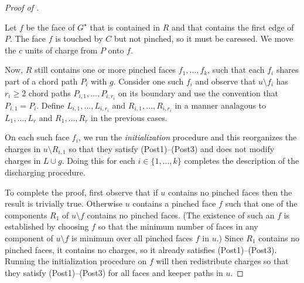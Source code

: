 \documentclass{patmorin}
\newcommand{\dual}[1]{{#1}^\star}
\begin{document}
\begin{proof}[Proof of ]
\begin{enumerate}
  Let $f$ be the face of $\dual{G}$ that is contained in $R$ and that contains the first edge of $P$.  The face $f$ is touched by $C$ but not pinched, so it must be caressed.  We move the $c$ units of charge from $P$ onto $f$.

  Now, $R$ still contains one or more pinched faces  $f_1,\ldots,f_k$, such that each $f_i$ shares part of a chord path $P_i$ with $g$.  Consider one such $f_i$ and observe that $u\setminus f_i$ has $r_i\ge 2$ chord paths $P_{i,1},\ldots,P_{i,r_i}$ on its boundary and use the convention that $P_{i,1}=P_i$.  Define $L_{i,1},\ldots,L_{i,r_i}$ and $R_{i,1},\ldots,R_{i,r_i}$ in a manner analagous to $L_1,\ldots,L_r$ and $R_1,\ldots,R_r$ in the previous cases.

  On each such face $f_i$, we run the \emph{initialization} procedure and this reorganizes the charges in $u\setminus R_{i,1}$ so that they satisfy (Post1)--(Post3) and does not modify charges in $L\cup g$.  Doing this for each $i\in\{1,\ldots,k\}$ completes the description of the discharging procedure.
\end{enumerate}
  To complete the proof, first observe that if $u$ contains no pinched faces then the result is trivially true. Otherwise $u$ contains a pinched face $f$ such that one of the components $R_1$ of $u\setminus f$ contains no pinched faces.  (The existence of such an $f$ is established by choosing $f$ so that the minimum number of faces in any component of $u\setminus f$ is minimum over all pinched faces $f$ in $u$.)  Since $R_1$ contains no pinched faces, it contains no charges, so it already satisfies (Post1)--(Post3). Running the initialization procedure on $f$ will then redistribute charges so that they satisfy (Post1)--(Post3) for all faces and keeper paths in $u$.
\end{proof}
\end{document}
